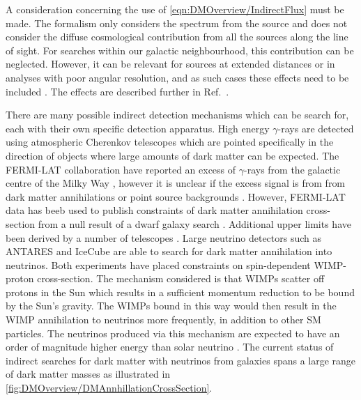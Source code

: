 A consideration concerning the use of \autoref{eqn:DMOverview/IndirectFlux} must be made. The formalism only considers the spectrum from the source and does not consider the diffuse
cosmological contribution from all the sources along the line of sight. For searches within our galactic neighbourhood, this contribution can be neglected. However, it can be relevant for sources at extended distances or in analyses with poor angular resolution, and as such cases these effects need to be included \cite{PerezdelosHeros:2020qyt}. The effects are described further in Ref.~\cite{Beacom:2006tt,Ullio:2002pj}.

There are many possible indirect detection mechanisms which can be search for, each with their own specific detection apparatus.
High energy $\gamma$-rays are detected using atmospheric Cherenkov telescopes which are pointed specifically in the direction of objects where large amounts of dark matter can be expected. The FERMI-LAT collaboration have reported an excess of $\gamma$-rays from the galactic centre of the Milky Way \cite{Fermi-LAT:2015sau}, however it is unclear if the excess signal is from from dark matter annihilations or point source backgrounds \cite{Boyarsky_2011}. However, FERMI-LAT data has beeb used to publish constraints of dark matter annihilation cross-section from a null result of a dwarf galaxy search \cite{Fermi-LAT:2015ycq}. Additional upper limits have been derived by a number of telescopes \cite{Aleksic:2013xea,HESS:2014zqa,VERITAS:2017tif}. 
Large neutrino detectors such as ANTARES \cite{ANTARES:2016xuh} and IceCube \cite{IceCube:2009iyf} are able to search for dark matter annihilation into neutrinos. Both experiments have placed constraints on spin-dependent WIMP-proton cross-section. The mechanism considered is that WIMPs scatter off protons in the Sun which results in a sufficient momentum reduction to be bound by the Sun's gravity. The WIMPs bound in this way would then result in the WIMP annihilation to neutrinos more frequently, in addition to other SM particles. The neutrinos produced via this mechanism are expected to have an order of magnitude higher energy than solar neutrino \cite{Hooper:2025ohk,Super-Kamiokande:2020sgt}. The current status of indirect searches for dark matter with neutrinos from galaxies spans a large range of dark matter masses as illustrated in \autoref{fig:DMOverview/DMAnnhillationCrossSection}.
